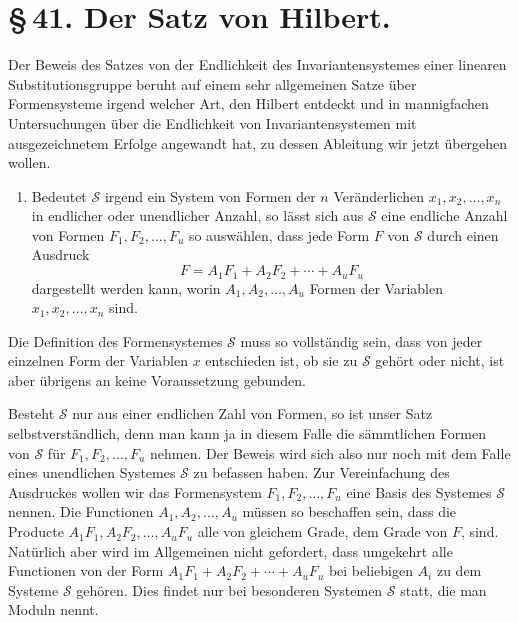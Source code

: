 \documentclass[11pt]{article}
\begin{document}
\section*{\S\,41. Der Satz von Hilbert.}

Der Beweis des Satzes von der Endlichkeit des Invariantensystemes einer linearen Substitutionsgruppe beruht auf einem sehr allgemeinen Satze über Formensysteme irgend welcher Art, den Hilbert entdeckt und in mannigfachen Untersuchungen über die Endlichkeit von Invariantensystemen mit ausgezeichnetem Erfolge angewandt hat, zu dessen Ableitung wir jetzt übergehen wollen.

\begin{enumerate}[label=\Roman*.,leftmargin=2.4em]
\item Bedeutet $\mathcal S$ irgend ein System von Formen der $n$ Veränderlichen $x_1,x_2,\ldots,x_n$ in endlicher oder unendlicher Anzahl, so lässt sich aus $\mathcal S$ eine endliche Anzahl von Formen $F_1,F_2,\ldots,F_u$ so auswählen, dass jede Form $F$ von $\mathcal S$ durch einen Ausdruck
\begin{equation}
F=A_1F_1+A_2F_2+\cdots+A_uF_u
\tag{1}
\end{equation}
dargestellt werden kann, worin $A_1,A_2,\ldots,A_u$ Formen der Variablen $x_1,x_2,\ldots,x_n$ sind.
\end{enumerate}

Die Definition des Formensystemes $\mathcal S$ muss so vollständig sein, dass von jeder einzelnen Form der Variablen $x$ entschieden ist, ob sie zu $\mathcal S$ gehört oder nicht, ist aber übrigens an keine Voraussetzung gebunden.

Besteht $\mathcal S$ nur aus einer endlichen Zahl von Formen, so ist unser Satz selbstverständlich, denn man kann ja in diesem Falle die sämmtlichen Formen von $\mathcal S$ für $F_1,F_2,\ldots,F_u$ nehmen. Der Beweis wird sich also nur noch mit dem Falle eines unendlichen Systemes $\mathcal S$ zu befassen haben. Zur Vereinfachung des Ausdruckes wollen wir das Formensystem $F_1,F_2,\ldots,F_u$ eine Basis des Systemes $\mathcal S$ nennen. Die Functionen $A_1,A_2,\ldots,A_u$ müssen so beschaffen sein, dass die Producte $A_1F_1,A_2F_2,\ldots,A_uF_u$ alle von gleichem Grade, dem Grade von $F$, sind. Natürlich aber wird im Allgemeinen nicht gefordert, dass umgekehrt alle Functionen von der Form $A_1F_1+A_2F_2+\cdots+A_uF_u$ bei beliebigen $A_i$ zu dem Systeme $\mathcal S$ gehören. Dies findet nur bei besonderen Systemen $\mathcal S$ statt, die man Moduln nennt.
\end{document}
